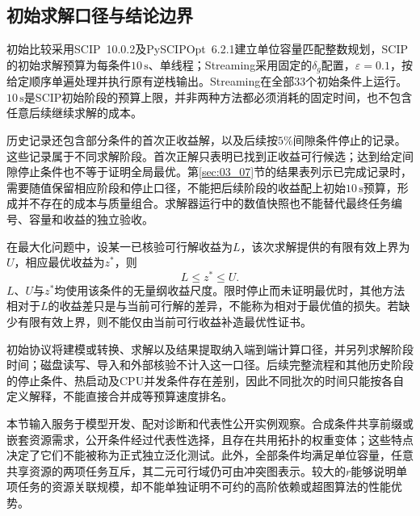 \subsection{初始求解口径与结论边界}

初始比较采用SCIP~10.0.2及PySCIPOpt~6.2.1建立单位容量匹配整数规划，SCIP的初始求解预算为每条件$10\,\mathrm{s}$、单线程；Streaming采用固定的$\delta_g$配置，$\varepsilon=0.1$，按给定顺序单遍处理并执行原有逆栈输出。Streaming在全部$33$个初始条件上运行。$10\,\mathrm{s}$是SCIP初始阶段的预算上限，并非两种方法都必须消耗的固定时间，也不包含任意后续继续求解的成本。

历史记录还包含部分条件的首次正收益解，以及后续按$5\%$间隙条件停止的记录。这些记录属于不同求解阶段。首次正解只表明已找到正收益可行候选；达到给定间隙停止条件也不等于证明全局最优。第\ref{sec:03_07}节的结果表列示已完成记录时，需要随值保留相应阶段和停止口径，不能把后续阶段的收益配上初始$10\,\mathrm{s}$预算，形成并不存在的成本与质量组合。求解器运行中的数值快照也不能替代最终任务编号、容量和收益的独立验收。

在最大化问题中，设某一已核验可行解收益为$L$，该次求解提供的有限有效上界为$U$，相应最优收益为$z^*$，则
\begin{equation}
 L\leq z^*\leq U.
 \label{s0305:bound_meaning}
\end{equation}
$L$、$U$与$z^*$均使用该条件的无量纲收益尺度。限时停止而未证明最优时，其他方法相对于$L$的收益差只是与当前可行解的差异，不能称为相对于最优值的损失。若缺少有限有效上界，则不能仅由当前可行收益补造最优性证书。

初始协议将建模或转换、求解以及结果提取纳入端到端计算口径，并另列求解阶段时间；磁盘读写、导入和外部核验不计入这一口径。后续完整流程和其他历史阶段的停止条件、热启动及CPU并发条件存在差别，因此不同批次的时间只能按各自定义解释，不能直接合并成等预算速度排名。

本节输入服务于模型开发、配对诊断和代表性公开实例观察。合成条件共享前缀或嵌套资源需求，公开条件经过代表性选择，且存在共用拓扑的权重变体；这些特点决定了它们不能被称为正式独立泛化测试。此外，全部条件均满足单位容量，任意共享资源的两项任务互斥，其二元可行域仍可由冲突图表示。较大的$r$能够说明单项任务的资源关联规模，却不能单独证明不可约的高阶依赖或超图算法的性能优势。
